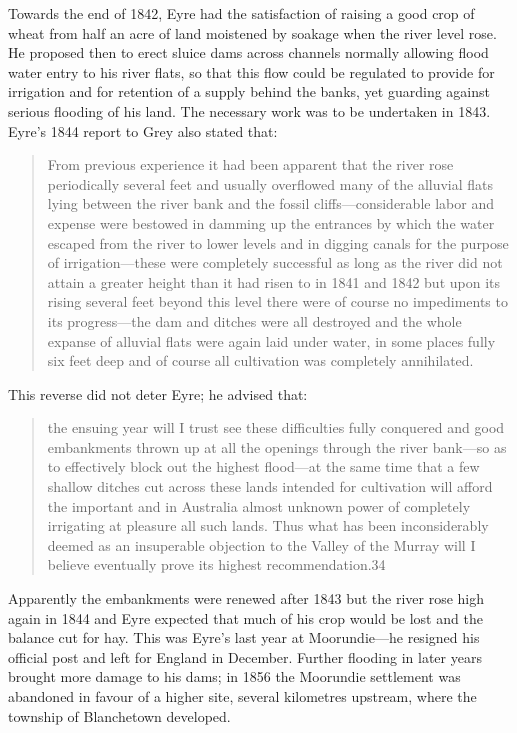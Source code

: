 Towards the end of 1842, Eyre had the satisfaction of raising a good
crop of wheat from half an acre of land moistened by soakage when the
river level rose.  He proposed then to erect sluice dams across
channels normally allowing flood water entry to his river flats, so
that this flow could be regulated to provide for irrigation and for
retention of a supply behind the banks, yet guarding against serious
flooding of his land.  The
necessary work was to be undertaken in 1843.  Eyre's 1844 report to
Grey also stated that:
\begin{quote}
	From previous experience it had been apparent that the river
	rose periodically several feet and usually overflowed many of
	the alluvial flats lying between the river bank and the fossil
	cliffs---considerable labor and expense were bestowed in
	damming up the entrances by which the water escaped from the
	river to lower levels and in digging canals for the purpose of
	irrigation---these were completely successful as long as the
	river did not attain a greater height than it had risen to in
	1841 and 1842 but upon its rising several feet beyond this
	level there were of course no impediments to its
	progress---the dam and ditches were all destroyed and the
	whole expanse of alluvial flats were again laid under water,
	in some places fully six feet deep and of course all
	cultivation was completely annihilated.
\end{quote}

This reverse did not deter Eyre; he advised that:
\begin{quote}
	the ensuing year will I trust see these difficulties fully
        conquered and good embankments thrown up at all the openings
        through the river bank---so as to effectively block out the
        highest flood---at the same time that a few shallow ditches
        cut across these lands intended for cultivation will afford
        the important and in Australia almost unknown power of
        completely irrigating at pleasure all such lands. Thus what
        has been inconsiderably deemed as an insuperable objection to
        the Valley of the Murray will I believe eventually prove its
        highest recommendation.34
\end{quote}

Apparently the embankments were renewed after 1843 but the river rose
high again in 1844 and Eyre expected that much of his crop would be
lost and the balance cut for hay. This
was Eyre's last year at Moorundie---he resigned his official post and
left for England in December.  Further flooding in later years brought
more damage to his dams; in 1856 the Moorundie settlement was
abandoned in favour of a higher site, several kilometres upstream,
where the township of Blanchetown developed.

